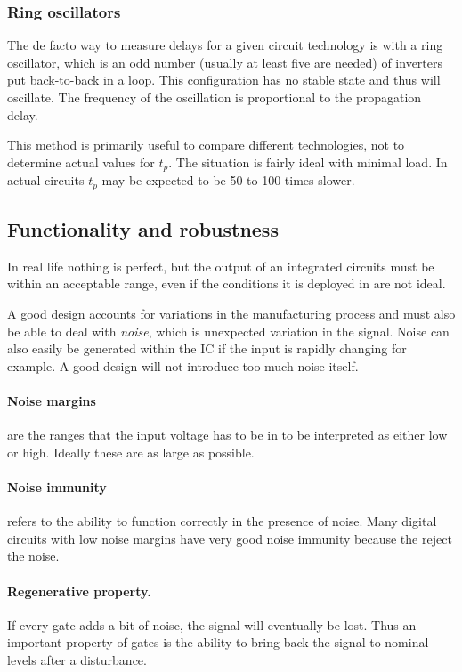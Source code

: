 \documentclass{report}
\begin{document}
\subsubsection{Ring oscillators}
The de facto way to measure delays for a given circuit technology is with a ring oscillator, which is an odd number (usually at least five are needed) of inverters put back-to-back in a loop. This configuration has no stable state and thus will oscillate. The frequency of the oscillation is proportional to the propagation delay.

This method is primarily useful to compare different technologies, not to determine actual values for $t_p$. The situation is fairly ideal with minimal load. In actual circuits $t_p$ may be expected to be 50 to 100 times slower. 

\subsection{Functionality and robustness}
In real life nothing is perfect, but the output of an integrated circuits must be within an acceptable range, even if the conditions it is deployed in are not ideal.

A good design accounts for variations in the manufacturing process and must also be able to deal with \textit{noise}, which is unexpected variation in the signal. Noise can also easily be generated within the IC if the input is rapidly changing for example. A good design will not introduce too much noise itself.
\paragraph{Noise margins} are the ranges that the input voltage has to be in to be interpreted as either low or high. Ideally these are as large as possible.
\paragraph{Noise immunity} refers to the ability to function correctly in the presence of noise. Many digital circuits with low noise margins have very good noise immunity because the reject the noise.
\paragraph{Regenerative property.} If every gate adds a bit of noise, the signal will eventually be lost. Thus an important property of gates is the ability to bring back the signal to nominal levels after a disturbance.
\end{document}
